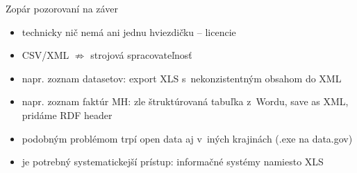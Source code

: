 \documentclass[slovak,14pt,utf8]{beamer}
\begin{document}
\begin{frame}{Zopár pozorovaní na záver}
    \begin{itemize}
        \item technicky nič nemá ani jednu hviezdičku -- licencie
        \item CSV/XML $\not\Rightarrow$ strojová spracovateľnosť
        \item napr. zoznam datasetov: export XLS s~nekonzistentným obsahom do XML
        \item napr. zoznam faktúr MH: zle štruktúrovaná tabuľka z~Wordu, save as XML,
              pridáme RDF header
        \item podobným problémom trpí open data aj v~iných krajinách (.exe na data.gov)
        \item je potrebný systematickejší prístup: informačné systémy namiesto XLS
    \end{itemize}
\end{frame}
\end{document}
